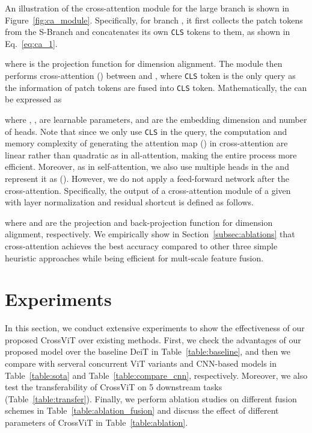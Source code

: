 \documentclass[10pt,twocolumn,letterpaper]{article}
\def\clstoken{\texttt{CLS}\xspace}
\def\ours{CrossViT\xspace}
\begin{document}
An illustration of the cross-attention module for the large branch is shown in Figure~\ref{fig:ca_module}. 
Specifically, for branch , it first collects the patch tokens from the S-Branch and concatenates its own \clstoken tokens to them, as shown in Eq.~\ref{eq:ca_1}.

 
where  is the projection function for dimension alignment.
The module then performs cross-attention () between  and , where \clstoken token is the only query as the information of patch tokens are fused into \clstoken token. Mathematically, the  can be expressed as  

where , ,   are learnable parameters,  and  are the embedding dimension and number of heads.
Note that since we only use \clstoken in the query, the computation and memory complexity of generating the attention map () in cross-attention are linear rather than quadratic as in all-attention, making the entire process more efficient. Moreover, as in self-attention, we also use multiple heads in the  and represent it as (). However, we do not apply a feed-forward network  after the cross-attention. 
Specifically, the output  of a cross-attention module of a given  with layer normalization and residual shortcut is defined as follows.

where  and  are the projection and back-projection function for dimension alignment, respectively.
We empirically show in Section~\ref{subsec:ablations} that cross-attention achieves the best accuracy compared to other three simple heuristic approaches while being efficient for mult-scale feature fusion. 

 
 
\section{Experiments}
\label{sec:exp}

In this section, we conduct extensive experiments to show the effectiveness of our proposed \ours over existing methods. First, we check the advantages of our proposed model over the baseline DeiT in Table~\ref{table:baseline}, and then we compare with serveral concurrent ViT variants and CNN-based models in Table~\ref{table:sota} and Table~\ref{table:compare_cnn}, respectively. Moreover, we also test the transferability of \ours on 5 downstream tasks (Table~\ref{table:transfer}). Finally, we perform ablation studies on different fusion schemes in Table~\ref{table:ablation_fusion} and discuss the effect of different parameters of \ours in Table~\ref{table:ablation}.
\end{document}
